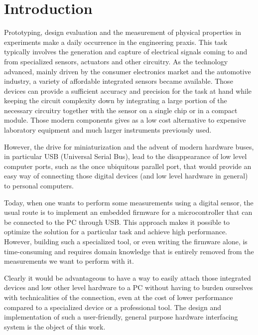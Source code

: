 \chapter{Introduction}

Prototyping, design evaluation and the measurement of physical properties in experiments make a daily occurrence in the engineering praxis. This task typically involves the generation and capture of electrical signals coming to and from specialized sensors, actuators and other circuitry. As the technology advanced, mainly driven by the consumer electronics market and the automotive industry, a variety of affordable integrated sensors became available. Those devices can provide a sufficient accuracy and precision for the task at hand while keeping the circuit complexity down by integrating a large portion of the necessary circuitry together with the sensor on a single chip or in a compact module. Those modern components gives as a low cost alternative to expensive laboratory equipment and much larger instruments previously used.

However, the drive for miniaturization and the advent of modern hardware buses, in particular USB (Universal Serial Bus), lead to the disappearance of low level computer ports, such as the once ubiquitous parallel port, that would provide an easy way of connecting those digital devices (and low level hardware in general) to personal computers. 

Today, when one wants to perform some measurements using a digital sensor, the usual route is to implement an embedded firmware for a microcontroller that can be connected to the PC through USB. This approach makes it possible to optimize the solution for a particular task and achieve high performance. However, building such a specialized tool, or even writing the firmware alone, is time-consuming and requires domain knowledge that is entirely removed from the measurements we want to perform with it.

Clearly it would be advantageous to have a way to easily attach those integrated devices and low other level hardware to a PC without having to burden ourselves with technicalities of the connection, even at the cost of lower performance compared to a specialized device or a professional tool. The design and implementation of such a user-friendly, general purpose hardware interfacing system is the object of this work.











